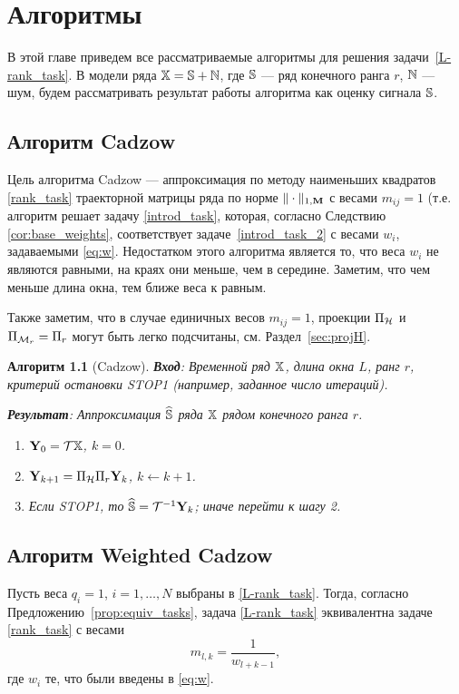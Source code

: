 \documentclass[12pt, specialist, subf,href,colorlinks=true,substylefile = spbu.rtx]{disser}
\newtheorem{algorithm}{Алгоритм}
\theoremstyle{remark}
\theoremstyle{definition}
\begin{document}
\chapter{Алгоритмы}
\label{sec:alg}
В этой главе приведем все рассматриваемые алгоритмы для решения задачи~\eqref{L-rank_task}.
В модели ряда $\mathbb{X}=\mathbb{S}+\mathbb{N}$, где $\mathbb{S}$ --- ряд конечного ранга $r$, $\mathbb{N}$ --- шум, будем рассматривать
результат работы алгоритма как оценку сигнала $\mathbb{S}$.

\section{Алгоритм Cadzow}
Цель алгоритма Cadzow \cite{Cadzow1988} --- аппроксимация по методу наименьших квадратов \eqref{rank_task} траекторной матрицы ряда по норме $\|\cdot\|_{1, \mathbf{M}}$ с весами $m_{ij}=1$ (т.е. алгоритм решает задачу \eqref{introd_task}, которая, согласно Следствию \ref{cor:base_weights}, соответствует задаче~\eqref{introd_task_2} с весами $w_i$, задаваемыми \eqref{eq:w}. Недостатком этого алгоритма является то, что веса $w_i$ не являются равными,
на краях они меньше, чем в середине. Заметим, что чем меньше длина окна, тем ближе веса к равным.

Также заметим, что в случае единичных весов $m_{ij}=1$, проекции $\Pi_{\mathcal{H}}$ и $\Pi_{\mathcal{M}_r}=\Pi_{r}$ могут быть легко подсчитаны, см. Раздел~\ref{sec:projH}.

\begin{algorithm}[Cadzow]
\textbf{Вход}: Временной ряд $\mathbb{X}$, длина окна $L$, ранг $r$,
критерий остановки STOP1 (например, заданное число итераций).

\textbf{Результат}:
Аппроксимация $\widehat{\mathbb{S}}$ ряда $\mathbb{X}$ рядом конечного ранга $r$.

\begin{enumerate}
\item
$\mathbf{Y}_0 = \mathcal{T} \mathbb{X}$, $k=0$.
\item
$\mathbf{Y}_{k+1} = \Pi_{\mathcal{H}}  \Pi_{r} \mathbf{Y}_{k}$, $k\leftarrow k+1$.
\item
Если STOP1, то $\widehat{\mathbb{S}} = \mathcal{T}^{-1} \mathbf{Y}_k$; иначе перейти к шагу 2.
\end{enumerate}
\end{algorithm}


\section{Алгоритм Weighted Cadzow}
Пусть веса $q_{i}=1$, $i = 1, \ldots, N$ выбраны в \eqref{L-rank_task}. Тогда, согласно Предложению~\ref{prop:equiv_tasks}, задача \eqref{L-rank_task} эквивалентна задаче \eqref{rank_task} с весами
\begin{equation}
\label{Mw}
   m_{l, k} = \frac{1}{w_{l + k - 1}},
\end{equation}
где $w_i$ те, что были введены в  \eqref{eq:w}.
\end{document}
